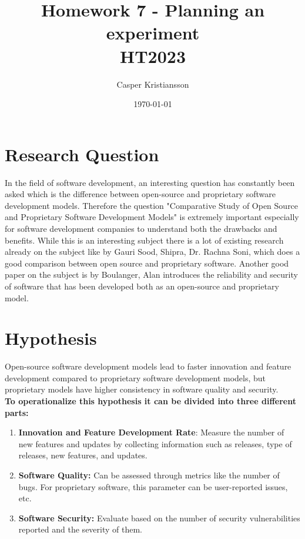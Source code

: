\documentclass{article}
\title{Homework 7 - Planning an experiment\\HT2023}
\author{Casper Kristiansson}
\date{\today}
\begin{document}
\maketitle

\section{Research Question}
In the field of software development, an interesting question has constantly been asked which is the difference between open-source and proprietary software development models. Therefore the question "Comparative Study of Open Source and Proprietary Software Development Models" is extremely important especially for software development companies to understand both the drawbacks and benefits. While this is an interesting subject there is a lot of existing research already on the subject like  \cite{sood2016comparative} by Gauri Sood, Shipra, Dr. Rachna Soni, which does a good comparison between open source and proprietary software. Another good paper on the subject is  \cite{boulanger2005open} by Boulanger, Alan introduces the reliability and security of software that has been developed both as an open-source and proprietary model.

\section{Hypothesis}
Open-source software development models lead to faster innovation and feature development compared to proprietary software development models, but proprietary models have higher consistency in software quality and security.\\


\noindent \textbf{To operationalize this hypothesis it can be divided into three different parts:}
\begin{enumerate}
    \item \textbf{Innovation and Feature Development Rate}: Measure the number of new features and updates by collecting information such as releases, type of releases, new features, and updates.
    \item \textbf{Software Quality:} Can be assessed through metrics like the number of bugs. For proprietary software, this parameter can be user-reported issues, etc. 
    \item \textbf{Software Security:} Evaluate based on the number of security vulnerabilities reported and the severity of them.
\end{enumerate}
\end{document}
